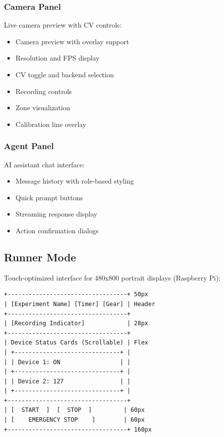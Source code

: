 \documentclass[11pt,a4paper]{article}
\begin{document}
\subsubsection{Camera Panel}

Live camera preview with CV controls:

\begin{itemize}    \item Camera preview with overlay support
    \item Resolution and FPS display
    \item CV toggle and backend selection
    \item Recording controls
    \item Zone visualization
    \item Calibration line overlay
\end{itemize}

\subsubsection{Agent Panel}

AI assistant chat interface:

\begin{itemize}    \item Message history with role-based styling
    \item Quick prompt buttons
    \item Streaming response display
    \item Action confirmation dialogs
\end{itemize}

\subsection{Runner Mode}

Touch-optimized interface for 480x800 portrait displays (Raspberry Pi):

\begin{verbatim}
+----------------------------------+ 50px
| [Experiment Name] [Timer] [Gear] | Header
+----------------------------------+
| [Recording Indicator]            | 28px
+----------------------------------+
| Device Status Cards (Scrollable) | Flex
| +------------------------------+ |
| | Device 1: ON                 | |
| +------------------------------+ |
| | Device 2: 127                | |
| +------------------------------+ |
+----------------------------------+
| [  START  ]  [  STOP  ]         | 60px
| [    EMERGENCY STOP    ]        | 60px
+----------------------------------+ 160px
\end{verbatim}
\end{document}
